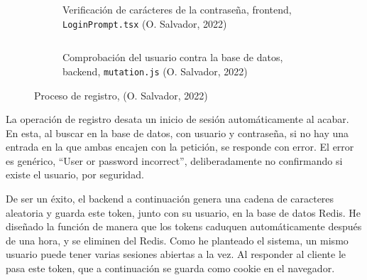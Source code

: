 \documentclass[11pt]{article}
\begin{document}
\begin{flushleft}
		\begin{figure}[htb]
			\centering
			\begin{subfigure}{.9\textwidth}
				\hspace{-3cm}
				\inputminted[fontsize=\scriptsize, firstline=74, lastline=74, linenos, frame=single, tabsize=1]{javascript}{../../frontend/src/components/LoginPrompt.tsx}
				\caption{Verificación de carácteres de la contraseña, frontend, \texttt{LoginPrompt.tsx} (O. Salvador, 2022)}
			\end{subfigure}
			\linebreak
			
			
			
			\begin{subfigure}{.9\textwidth}
				\hspace{-3cm}
				\inputminted[fontsize=\scriptsize, firstline=153, lastline=160, linenos, frame=single]{javascript}{../../backend/src/resolvers/mutation.js}
				\caption{Comprobación del usuario contra la base de datos, backend, \texttt{mutation.js} (O. Salvador, 2022)}
			\end{subfigure}
			

			\caption{Proceso de registro, (O. Salvador, 2022)}
		\end{figure}
		
	La operación de registro desata un inicio de sesión automáticamente al acabar. En esta, al buscar en la base de datos, con usuario y contraseña, si no hay una entrada en la que ambas encajen con la petición, se responde con error. El error es genérico, ``User or password incorrect'', deliberadamente no confirmando si existe el usuario, por seguridad. 
	\linebreak
	
	De ser un éxito, el backend a continuación genera una cadena de caracteres aleatoria y guarda este token, junto con su usuario, en la base de datos Redis. He diseñado la función de manera que los tokens caduquen automáticamente después de una hora, y se eliminen del Redis. Como he planteado el sistema, un mismo usuario puede tener varias sesiones abiertas a la vez. Al responder al cliente le pasa este token, que a continuación se guarda como cookie en el navegador.
	\linebreak
	

\end{flushleft}
\end{document}
